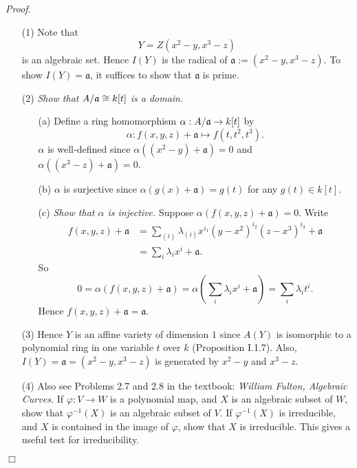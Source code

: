 \documentclass{article}
\begin{document}
\emph{Proof.}
\begin{enumerate}
\item[(1)]
  Note that
  \[
    Y = Z(x^2-y, x^3-z)
  \]
  is an algebraic set.
  Hence $I(Y)$ is the radical of $\mathfrak{a} := (x^2-y, x^3-z)$.
  To show $I(Y) = \mathfrak{a}$, it suffices to show that $\mathfrak{a}$ is prime.

\item[(2)]
  \emph{Show that $A/\frak{a} \cong k[t]$ is a domain.}
  \begin{enumerate}
  \item[(a)]
    Define a ring homomorphism $\alpha: A/\frak{a} \to k[t]$
    by
    \[
      \alpha: f(x,y,z) + \mathfrak{a} \mapsto f(t,t^2,t^3).
    \]
    $\alpha$ is well-defined since
    $\alpha((x^2-y) + \mathfrak{a}) = 0$ and
    $\alpha((x^3-z) + \mathfrak{a}) = 0$.

  \item[(b)]
    $\alpha$ is surjective
    since $\alpha(g(x) + \mathfrak{a}) = g(t)$ for any $g(t) \in k[t]$.

  \item[(c)]
    \emph{Show that $\alpha$ is injective.}
    Suppose $\alpha(f(x,y,z) + \mathfrak{a}) = 0$.
    Write
    \begin{align*}
      f(x,y,z) + \mathfrak{a}
      &= \sum_{(i)} \lambda_{(i)} x^{i_1} (y-x^2)^{i_2} (z-x^3)^{i_3} + \mathfrak{a} \\
      &= \sum_{i} \lambda_{i} x^{i} + \mathfrak{a}.
    \end{align*}
    So
    \[
      0
      = \alpha(f(x,y,z) + \mathfrak{a})
      = \alpha\left(\sum_{i} \lambda_{i} x^{i} + \mathfrak{a} \right)
      = \sum_{i} \lambda_{i} t^{i}.
    \]
    Hence $f(x,y,z) + \mathfrak{a} = \mathfrak{a}$.
  \end{enumerate}

\item[(3)]
  Hence $Y$ is an affine variety of dimension $1$
  since $A(Y)$ is isomorphic to a polynomial ring in one variable $t$ over $k$ (Proposition I.1.7).
  Also, $I(Y) = \mathfrak{a} = (x^2-y, x^3-z)$ is generated by $x^2-y$ and $x^3-z$.


\item[(4)]
  Also see Problems 2.7 and 2.8 in the textbook:
  \emph{William Fulton, Algebraic Curves.}
  If $\varphi: V \to W$ is a polynomial map,
  and $X$ is an algebraic subset of $W$,
  show that $\varphi^{-1}(X)$ is an algebraic subset of $V$.
  If $\varphi^{-1}(X)$ is irreducible,
  and $X$ is contained in the image of $\varphi$, show that $X$ is irreducible.
  This gives a useful test for irreducibility.
\end{enumerate}
$\Box$ \\\\
\end{document}
